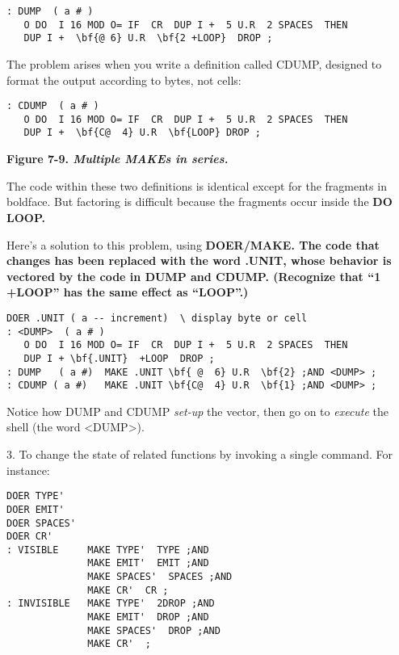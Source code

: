 \begin{verbatim}
: DUMP  ( a # )
   O DO  I 16 MOD O= IF  CR  DUP I +  5 U.R  2 SPACES  THEN
   DUP I +  \bf{@ 6} U.R  \bf{2 +LOOP}  DROP ;
\end{verbatim}

The problem arises when you write a definition called CDUMP, designed to
format the output according to bytes, not cells:

\begin{verbatim}
: CDUMP  ( a # )
   O DO  I 16 MOD O= IF  CR  DUP I +  5 U.R  2 SPACES  THEN
   DUP I +  \bf{C@  4} U.R  \bf{LOOP} DROP ;
\end{verbatim}

\bf{Figure 7-9.} \emph{Multiple MAKEs in series.}


The code within these two definitions is identical except for the fragments
in boldface. But factoring is difficult because the fragments occur inside the
\bf{DO LOOP}.

Here's a solution to this problem, using \bf{DOER/MAKE}. The code that
changes has been replaced with the word .UNIT, whose behavior is vectored
by the code in DUMP and CDUMP. (Recognize that ``\bf{1 +LOOP}'' has
the same effect as ``\bf{LOOP}''.)

\begin{verbatim}
DOER .UNIT ( a -- increment)  \ display byte or cell
: <DUMP>  ( a # )
   O DO  I 16 MOD O= IF  CR  DUP I +  5 U.R  2 SPACES  THEN
   DUP I + \bf{.UNIT}  +LOOP  DROP ;
: DUMP   ( a #)  MAKE .UNIT \bf{ @  6} U.R  \bf{2} ;AND <DUMP> ;
: CDUMP ( a #)   MAKE .UNIT \bf{C@  4} U.R  \bf{1} ;AND <DUMP> ;
\end{verbatim}

Notice how DUMP and CDUMP \emph{set-up} the vector, then go on to
\emph{execute} the shell (the word <DUMP>).

3. To change the state of related functions by invoking a single command. For
instance:

\begin{verbatim}
DOER TYPE'
DOER EMIT'
DOER SPACES'
DOER CR'
: VISIBLE     MAKE TYPE'  TYPE ;AND
              MAKE EMIT'  EMIT ;AND
              MAKE SPACES'  SPACES ;AND
              MAKE CR'  CR ;
: INVISIBLE   MAKE TYPE'  2DROP ;AND
              MAKE EMIT'  DROP ;AND
              MAKE SPACES'  DROP ;AND
              MAKE CR'  ;
\end{verbatim}

